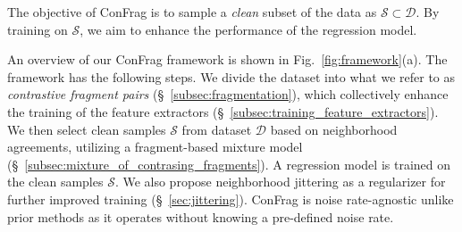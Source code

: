 \documentclass{article}
\def\ie{\textit{i.e}., } \def\Ie{\textit{I.e}., }
\theoremstyle{plain}
\theoremstyle{definition}
\theoremstyle{remark}
\begin{document}
The objective of ConFrag is to sample a \textit{clean} subset of the data as $\mathcal{S} \subset \mathcal{D}$. 
By training on $\mathcal{S}$, we aim to enhance the  performance of the regression model.

An overview of our ConFrag framework is shown in Fig.~\ref{fig:framework}(a). 
The framework has the following steps.
We divide the dataset into what we refer to as \textit{contrastive fragment pairs} (\S~\ref{subsec:fragmentation}), which collectively enhance the training of the feature extractors (\S~\ref{subsec:training_feature_extractors}).
We then select clean samples $\mathcal{S}$ from dataset $\mathcal{D}$ based on neighborhood agreements, utilizing a fragment-based mixture model (\S~\ref{subsec:mixture_of_contrasing_fragments}). %
A regression model is trained on the clean samples $\mathcal{S}$.
We also propose neighborhood jittering as a regularizer for further improved training (\S~\ref{sec:jittering}).
ConFrag is noise rate-agnostic unlike prior methods as it operates without knowing a pre-defined noise rate.
\end{document}
